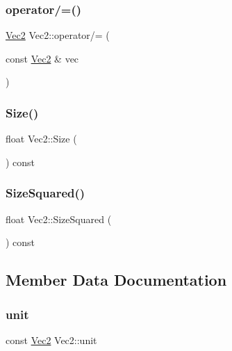\mbox{\label{struct_vec2_afdf4316abb4b2a286886bb1e85be783d}} 
\subsubsection{\texorpdfstring{operator/=()}{operator/=()}}
{\footnotesize\ttfamily \mbox{\hyperlink{struct_vec2}{Vec2}} Vec2\+::operator/= (\begin{DoxyParamCaption}\item[{const \mbox{\hyperlink{struct_vec2}{Vec2}} \&}]{vec }\end{DoxyParamCaption})}

\mbox{\label{struct_vec2_a2d243a47e5ee4e168c71f3e013900ea8}} 
\subsubsection{\texorpdfstring{Size()}{Size()}}
{\footnotesize\ttfamily float Vec2\+::\+Size (\begin{DoxyParamCaption}{ }\end{DoxyParamCaption}) const}

\mbox{\label{struct_vec2_ae3f8d3905cd5f737fa91a8dcfa250fe9}} 
\subsubsection{\texorpdfstring{Size\+Squared()}{SizeSquared()}}
{\footnotesize\ttfamily float Vec2\+::\+Size\+Squared (\begin{DoxyParamCaption}{ }\end{DoxyParamCaption}) const}



\subsection{Member Data Documentation}
\mbox{\label{struct_vec2_a2350eb6448cb5b550f63842929423ce0}} 
\subsubsection{\texorpdfstring{unit}{unit}}
{\footnotesize\ttfamily const \mbox{\hyperlink{struct_vec2}{Vec2}} Vec2\+::unit\hspace{0.3cm}{\ttfamily [static]}}

